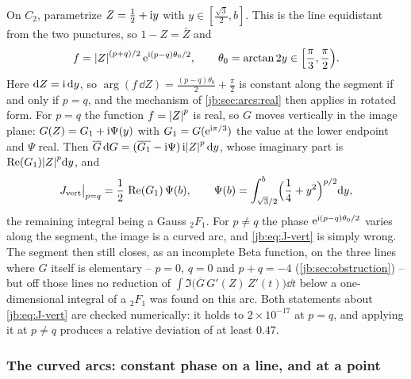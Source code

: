 On $C_2$, parametrize $Z = \tfrac12 + \mathrm{i} y$ with $y \in [\tfrac{\sqrt3}{2}, b]$.
This is the line equidistant from the two punctures, so $1 - Z = \bar Z$ and
\begin{equation}
  \label{jb:eq:f-vert}
  f
    = {|Z|}^{(p + q)/2} \, \mathrm{e}^{\mathrm{i} (p - q) \theta_0 / 2},
  \qquad
  \theta_0
    = \arctan 2y
    \in \Bigl[ \frac{\pi}{3}, \frac{\pi}{2} \Bigr).
\end{equation}
Here $\mathrm{d} Z = \mathrm{i} \, \mathrm{d} y$, so $\arg(f \, \dd Z) = \tfrac{(p - q) \theta_0}{2} + \tfrac{\pi}{2}$
is constant along the segment if and only if $p = q$, and the mechanism of
\cref{jb:sec:arcs:real} then applies in rotated form.
For $p = q$ the function $f = {|Z|}^p$ is real, so $G$ moves vertically in the image plane:
$G(Z) = G_1 + \mathrm{i} \Psi(y)$ with $G_1 = G(\mathrm{e}^{\mathrm{i} \pi/3})$ the value at the lower endpoint and
$\Psi$ real.
Then $\overline{G} \, \mathrm{d} G = (\overline{G_1} - \mathrm{i} \Psi) \, \mathrm{i} {|Z|}^p \, \mathrm{d} y$, whose imaginary
part is $\operatorname{Re}(G_1) {|Z|}^p \mathrm{d} y$, and
\begin{equation}
  \label{jb:eq:J-vert}
  J_{\text{vert}} \big|_{p = q}
    = \frac12 \, \operatorname{Re} (G_1) \, \Psi(b),
  \qquad
  \Psi(b)
    = \int_{\sqrt3/2}^{b} \Bigl( \frac14 + y^2 \Bigr)^{p/2} \mathrm{d} y,
\end{equation}
the remaining integral being a Gauss ${}_2F_1$.
For $p \ne q$ the phase $\mathrm{e}^{\mathrm{i} (p - q) \theta_0 / 2}$ varies along the segment, the image is a
curved arc, and \eqref{jb:eq:J-vert} is simply wrong.
The segment then still closes, as an incomplete Beta function, on the three lines where $G$
itself is elementary -- $p = 0$, $q = 0$ and $p + q = -4$ (\cref{jb:sec:obstruction}) -- but off
those lines no reduction of
$\int \Im \bigl( \overline{G} \, G'(Z) \, Z'(t) \bigr) \dd t$ below a one-dimensional integral of a
${}_2F_1$ was found on this arc.
Both statements about \eqref{jb:eq:J-vert} are checked numerically: it holds to $2 \times 10^{-17}$ at
$p = q$, and applying it at $p \ne q$ produces a relative deviation of at least $0.47$.


\subsubsection{The curved arcs: constant phase on a line, and at a point}
\label{jb:sec:arcs:curved}

